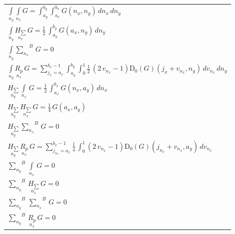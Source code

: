 \documentclass[11pt]{article}
\begin{document}
    \begin{center}
\begin{tabular}{ | l | }
\hline

$\int\limits_{n_y}^{} \int\limits_{n_x}^{} G = \int_{a_{y}}^{b_{y}} \int_{a_{x}}^{b_{x}} G\left(n_{x}, n_{y}\right)\,{d n_{x}}\,{d n_{y}}$ \\

$\int\limits_{n_y}^{} \underset{n_x}{H_{\sum}}\,G = \frac{1}{2} \, \int_{a_{y}}^{b_{y}} G\left(a_{x}, n_{y}\right)\,{d n_{y}}$ \\

$\int\limits_{n_y}^{} {\sum\limits_{n_x}^{}}^{B}\,G = 0$ \\

$\int\limits_{n_y}^{} \underset{n_x}{R_{p}}\,G = {\sum_{j_{x}=a_{x}}^{b_{x} - 1} \int_{a_{y}}^{b_{y}} \int_{0}^{1} \frac{1}{2} \, {\left(2 \, v_{n_{x}} - 1\right)} \mathrm{D}_{0}\left(G\right)\left(j_{x} + v_{n_{x}}, n_{y}\right)\,{d v_{n_{x}}}\,{d n_{y}}}$ \\

\hline\hline

$\underset{n_y}{H_{\sum}}\,\int\limits_{n_x}^{}\,G = \frac{1}{2} \, \int_{a_{x}}^{b_{x}} G\left(n_{x}, a_{y}\right)\,{d n_{x}}$ \\

$\underset{n_y}{H_{\sum}}\,\underset{n_x}{H_{\sum}}\,G = \frac{1}{4} \, G\left(a_{x}, a_{y}\right)$ \\

$\underset{n_y}{H_{\sum}}\,{\sum\limits_{n_x}^{}}^{B}\,G = 0$ \\

$\underset{n_y}{H_{\sum}}\,\underset{n_x}{R_{p}}\,G = {\sum_{j_{n_{x}}=a_{x}}^{b_{x} - 1} \frac{1}{4} \, \int_{0}^{1} \left(2 \, v_{n_{x}} - 1 \right) \mathrm{D}_{0}\left(G\right)\left(j_{n_{x}} + v_{n_{x}}, a_{y}\right)\,{d v_{n_{x}}} }$ \\

\hline\hline

${\sum\limits_{n_y}^{}}^{B}\,\int\limits_{n_x}^{}\,G = 0$ \\

${\sum\limits_{n_y}^{}}^{B}\,\underset{n_x}{H_{\sum}}\,G = 0$ \\

${\sum\limits_{n_y}^{}}^{B}\,{\sum\limits_{n_x}^{}}^{B}\,G = 0$ \\

${\sum\limits_{n_y}^{}}^{B}\,\underset{n_x}{R_{p}}\,G = 0$ \\


\end{tabular}
\end{center}
\end{document}
